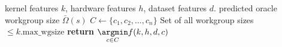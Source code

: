 \begin{algorithmic}[1]
  \Require kernel features $k$, hardware features $h$, dataset features
  $d$.
  \Ensure predicted oracle workgroup size $\bar{\Omega}(s)$
  \State $C \leftarrow \{c_1, c_2, \ldots, c_n \}$
  \Comment Set of all workgroup sizes $\le k.\text{max\_wgsize}$
  \State \textbf{return} $\underset{c \in C}{\argmin} f(k,h,d,c)$
\end{algorithmic}
